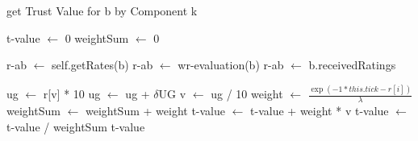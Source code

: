 
\begin{algorithm}[H]
\caption{get Trust Value for b by Component k}
\begin{algorithmic} 
\STATE t-value $\leftarrow$ 0
\STATE weightSum $\leftarrow$ 0

\STATE r-ab $\leftarrow$ self.getRates(b)
\ENDIF
{}
\STATE r-ab $\leftarrow$ wr-evaluation(b)
\ENDIF
{}
\STATE r-ab $\leftarrow$ b.receivedRatings
\ENDIF

\STATE ug $\leftarrow$ r[v] * 10
\STATE ug $\leftarrow$ ug + $\delta$UG
\STATE v $\leftarrow$ ug / 10
\STATE weight $\leftarrow$ $\frac{\exp{ (-1*this.tick-r[i]) }}{\lambda}$
\STATE weightSum $\leftarrow$ weightSum + weight
\STATE t-value $\leftarrow$ t-value + weight * v
\ENDFOR
\STATE t-value $\leftarrow$ t-value / weightSum
\RETURN t-value
\end{algorithmic}
\end{algorithm}
